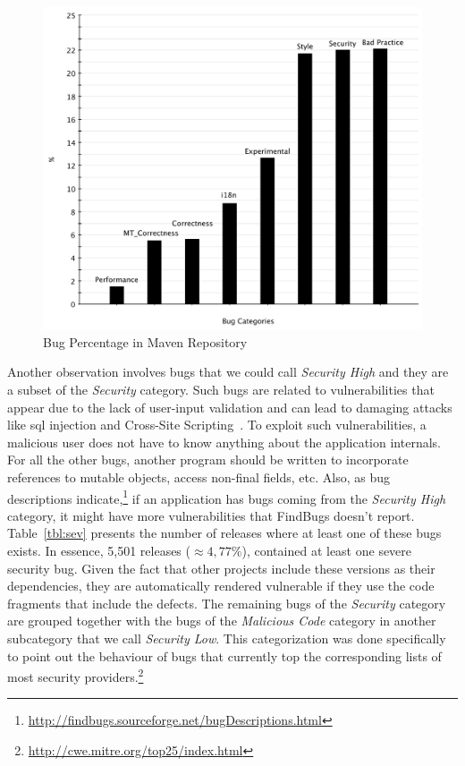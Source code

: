 \documentclass{sig-alternate}
\begin{document}
\begin{figure}[t]
	\centering
	\includegraphics[scale=0.39]{bug_percent}
	\caption{Bug Percentage in Maven Repository}
	\label{fig:bug-per} 
\end{figure}

Another observation involves bugs that we could call {\it
Security High} and they are a subset of the {\it Security} category.
Such bugs are related to vulnerabilities that appear due to the lack of user-input
validation and can lead to damaging attacks like {\sc sql} injection and
Cross-Site Scripting~\cite{RL12}.
To exploit such vulnerabilities, a malicious user does
not have to know anything about the application internals. For all the other
bugs, another program should be written to incorporate references to
mutable objects, access non-final fields, etc.
Also, as bug descriptions indicate,\footnote{\url{http://findbugs.sourceforge.net/bugDescriptions.html}}
if an application has bugs coming from the {\it Security High} category,
it might have more vulnerabilities that FindBugs doesn't report.
Table~\ref{tbl:sev} presents the number
of releases where at least one of these bugs exists. In essence, 5,501 releases
($\approx 4,77\% $), contained at
least one severe security bug. Given the fact that other projects include these
versions as their dependencies, they are automatically rendered vulnerable if
they use the code fragments that include the defects.
The remaining bugs of the {\it Security} category
are grouped together with the bugs of the {\it Malicious Code} category
in another subcategory that we call {\it Security Low}.
This categorization was done specifically to point out the
behaviour of bugs that currently top the corresponding lists of most
security providers.\footnote{\url{http://cwe.mitre.org/top25/index.html}}
\end{document}
